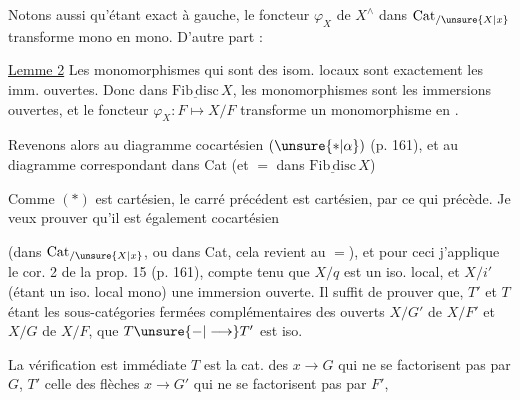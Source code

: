 Notons aussi qu'étant exact à gauche, le foncteur $\varphi_X$ de $X^\wedge$ dans $\mathrm{Cat}_{/\unsure{X|x}}$ transforme mono en mono. D'autre part :

\uline{Lemme 2} Les monomorphismes qui sont des isom.  locaux sont exactement les imm. ouvertes. Donc  dans $\underline{\mathrm{Fib\,disc}}\,X$, les monomorphismes sont les immersions ouvertes, et le foncteur $\varphi_X\colon F\longmapsto X/F$ transforme un monomorphisme en .

Revenons alors au diagramme cocartésien $(\unsure{*|\alpha})$ (p. 161), et au diagramme correspondant dans Cat (et $=$ dans $\underline{\mathrm{Fib\,disc}}\,X$)


Comme $(*)$ est cartésien, le carré précédent est cartésien, par ce qui précède. Je veux prouver qu'il est également cocartésien

(dans $\mathrm{Cat}_{/\unsure{X|x}}$, ou dans Cat, cela revient au $=$), et pour ceci j'applique le cor. 2 de la prop. 15 (p. 161), compte tenu que $X/q$ est un iso. local, et $X/i'$ (étant un iso. local mono) une immersion ouverte. Il suffit de prouver que,  $T'$ et $T$ étant les  sous-catégories fermées complémentaires des ouverts $X/G'$ de $X/F'$ et $X/G$ de $X/F$, que $T\unsure{-|\longrightarrow}T'$ est iso.

La vérification est immédiate \unsure{;} $T$ est la cat. des  $x\longrightarrow G$    qui ne se factorisent pas par $G$, $T'$ celle des flèches $x\longrightarrow G'$ qui ne se factorisent pas par $F'$,


